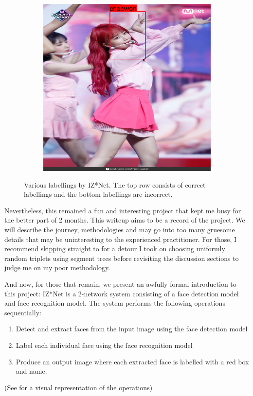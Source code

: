 \begin{figure}[htbp]
\begin{subfigure}[b]{0.32\textwidth}
    \end{subfigure}
    \hfill
    \begin{subfigure}[b]{0.32\textwidth}
        \centering
        \includegraphics[width=\textwidth]{images/introduction/yuri-incorrect.png}
    \end{subfigure}
    \hfill

    \caption{Various labellings by IZ*Net. The top row consists of correct labellings and the bottom labellings are incorrect.\protect\footnotemark}
    \label{Figure:Introduction:sample-labellings}
\end{figure}

Nevertheless, this remained a fun and interesting project that kept me busy for the better part of 2 months.
This writeup aims to be a record of the project.
We will describe the journey, methodologies and may go into too many gruesome details that may be uninteresting to the experienced practitioner.
For those, I recommend skipping straight to  for a detour I took on choosing uniformly random triplets using segment trees before revisiting the discussion sections to judge me on my poor methodology.

And now, for those that remain, we present an awfully formal introduction to this project: IZ*Net is a 2-network system consisting of a face detection model and face recognition model.
The system performs the following operations sequentially:
\begin{enumerate}
    \item Detect and extract faces from the input image using the face detection model
    \item Label each individual face using the face recognition model
    \item Produce an output image where each extracted face is labelled with a red box and name.
\end{enumerate}
(See  for a visual representation of the operations)

